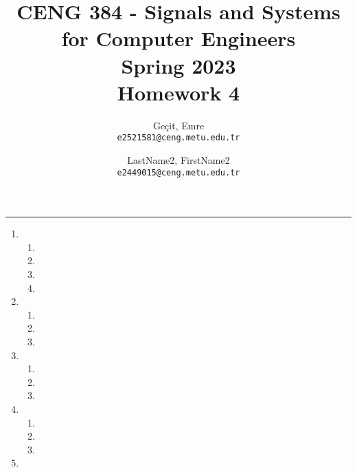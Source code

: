 \documentclass[10pt,a4paper, margin=1in]{article}
\author{
  Geçit, Emre\\
  \texttt{e2521581@ceng.metu.edu.tr}
  \and
  LastName2, FirstName2\\
  \texttt{e2449015@ceng.metu.edu.tr}
}
\title{CENG 384 - Signals and Systems for Computer Engineers \\
Spring 2023 \\
Homework 4}
\begin{document}
\maketitle



\noindent\rule{19cm}{1.2pt}

\begin{enumerate}

\item %
	\begin{enumerate}   
    \item %
    \item %
	\item %
    \item %
    \end{enumerate}

\item %
	\begin{enumerate}
    \item %
    \item %
	\item %
    \end{enumerate}

\item %
	\begin{enumerate}
    \item %
    \item %
	\item %
    \end{enumerate}

\item %
    \begin{enumerate}   
    \item %
    \item %
	\item %
    \end{enumerate}

\item %
        

\end{enumerate}
\end{document}
